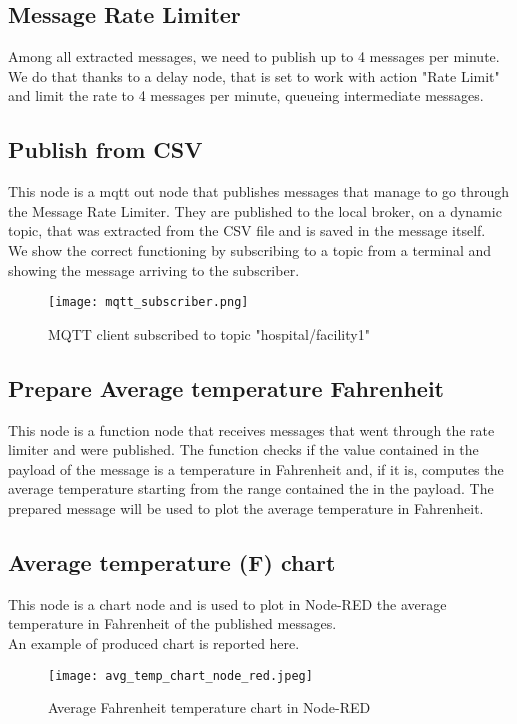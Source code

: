 \subsection{Message Rate Limiter}
Among all extracted messages, we need to publish up to 4 messages per minute. We do that thanks to a delay node, that is set to work with action "Rate Limit" and limit the rate to 4 messages per minute, queueing intermediate messages.  

\subsection{Publish from CSV}
This node is a mqtt out node that publishes messages that manage to go through the Message Rate Limiter. They are published to the local broker, on a dynamic topic, that was extracted from the CSV file and is saved in the message itself.\\
We show the correct functioning by subscribing to a topic from a terminal and showing the message arriving to the subscriber.

\begin{figure}[H]
    \centering
    \texttt{[image: mqtt\_subscriber.png]}
    \caption{MQTT client subscribed to topic "hospital/facility1"}
\end{figure}

\subsection{Prepare Average temperature Fahrenheit}
This node is a function node that receives messages that went through the rate limiter and were published. The function checks if the value contained in the payload of the message is a temperature in Fahrenheit and, if it is, computes the average temperature starting from the range contained the in the payload. The prepared message will be used to plot the average temperature in Fahrenheit.

\subsection{Average temperature (F) chart}
This node is a chart node and is used to plot in Node-RED the average temperature in Fahrenheit of the published messages.\\
An example of produced chart is reported here.

\begin{figure}[H]
    \centering
    \texttt{[image: avg\_temp\_chart\_node\_red.jpeg]}
    \caption{Average Fahrenheit temperature chart in Node-RED}
\end{figure}


